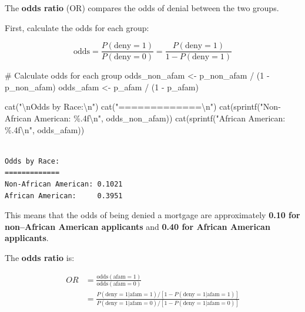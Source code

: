 \documentclass[
  12pt,
  a4paper,
]{scrbook}
\newenvironment{Shaded}{\begin{snugshade}}{\end{snugshade}}
\newcommand{\CommentTok}[1]{\textcolor[rgb]{0.37,0.37,0.37}{#1}}
\newcommand{\DecValTok}[1]{\textcolor[rgb]{0.68,0.00,0.00}{#1}}
\newcommand{\FunctionTok}[1]{\textcolor[rgb]{0.28,0.35,0.67}{#1}}
\newcommand{\NormalTok}[1]{\textcolor[rgb]{0.00,0.23,0.31}{#1}}
\newcommand{\OtherTok}[1]{\textcolor[rgb]{0.00,0.23,0.31}{#1}}
\newcommand{\SpecialCharTok}[1]{\textcolor[rgb]{0.37,0.37,0.37}{#1}}
\newcommand{\StringTok}[1]{\textcolor[rgb]{0.13,0.47,0.30}{#1}}
\theoremstyle{plain}
\theoremstyle{definition}
\theoremstyle{remark}
\begin{document}
\begin{enumerate}
  The \textbf{odds ratio} (OR) compares the odds of denial between the
  two groups.

  First, calculate the odds for each group:

  \[
  \text{odds} = \frac{P(\text{deny}=1)}{P(\text{deny}=0)} = \frac{P(\text{deny}=1)}{1 - P(\text{deny}=1)}
  \]

\begin{Shaded}
\begin{Highlighting}[]
\CommentTok{\# Calculate odds for each group}
\NormalTok{odds\_non\_afam }\OtherTok{\textless{}{-}}\NormalTok{ p\_non\_afam }\SpecialCharTok{/}\NormalTok{ (}\DecValTok{1} \SpecialCharTok{{-}}\NormalTok{ p\_non\_afam)}
\NormalTok{odds\_afam }\OtherTok{\textless{}{-}}\NormalTok{ p\_afam }\SpecialCharTok{/}\NormalTok{ (}\DecValTok{1} \SpecialCharTok{{-}}\NormalTok{ p\_afam)}

\FunctionTok{cat}\NormalTok{(}\StringTok{"}\SpecialCharTok{\textbackslash{}n}\StringTok{Odds by Race:}\SpecialCharTok{\textbackslash{}n}\StringTok{"}\NormalTok{)}
\FunctionTok{cat}\NormalTok{(}\StringTok{"=============}\SpecialCharTok{\textbackslash{}n}\StringTok{"}\NormalTok{)}
\FunctionTok{cat}\NormalTok{(}\FunctionTok{sprintf}\NormalTok{(}\StringTok{"Non{-}African American: \%.4f}\SpecialCharTok{\textbackslash{}n}\StringTok{"}\NormalTok{, odds\_non\_afam))}
\FunctionTok{cat}\NormalTok{(}\FunctionTok{sprintf}\NormalTok{(}\StringTok{"African American:     \%.4f}\SpecialCharTok{\textbackslash{}n}\StringTok{"}\NormalTok{, odds\_afam))}
\end{Highlighting}
\end{Shaded}

\begin{verbatim}

Odds by Race:
=============
Non-African American: 0.1021
African American:     0.3951
\end{verbatim}

  This means that the odds of being denied a mortgage are approximately
  \textbf{0.10 for non--African American applicants} and \textbf{0.40
  for African American applicants}.

  The {\textbf{odds ratio}} is:

  \[
  \begin{split}
  OR &= \frac{\text{odds}(\text{afam}=1)}{\text{odds}(\text{afam}=0)} \\
  &= \frac{P(\text{deny}=1|\text{afam}=1)/[1-P(\text{deny}=1|\text{afam}=1)]}{P(\text{deny}=1|\text{afam}=0)/[1-P(\text{deny}=1|\text{afam}=0)]} 
  \end{split}
  \]


\end{enumerate}
\end{document}
